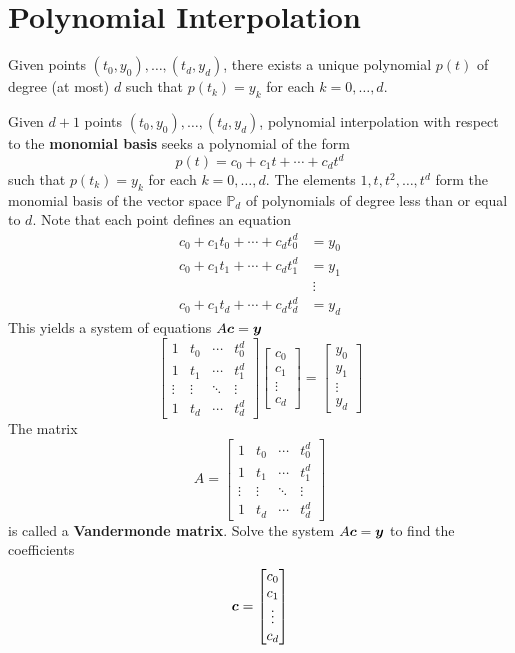 \section{Polynomial Interpolation}

\begin{bigidea}
Given points $(t_0,y_0), \dots , (t_d,y_d)$, there exists a unique polynomial $p(t)$ of degree (at most) $d$ such that $p(t_k) = y_k$ for each $k=0,\dots,d$.
\end{bigidea}

\begin{definition}
Given $d+1$ points $(t_0,y_0), \dots , (t_d,y_d)$, polynomial interpolation with respect to the {\bf monomial basis} \cite[p.312]{MH} seeks a polynomial of the form
$$
p(t) = c_0 + c_1 t + \cdots + c_d t^d
$$
such that $p(t_k) = y_k$ for each $k=0,\dots,d$. The elements $1,t,t^2,\dots,t^d$ form the monomial basis of the vector space $\mathbb{P}_d$ of polynomials of degree less than or equal to $d$. Note that each point defines an equation
\begin{align*}
c_0 + c_1t_0 + \cdots + c_d t_0^d &= y_0 \\
c_0 + c_1t_1 + \cdots + c_d t_1^d &= y_1 \\
& \ \vdots \\
c_0 + c_1t_d + \cdots + c_d t_d^d &= y_d
\end{align*}
This yields a system of equations $A \boldsymbol{c} = \boldsymbol{y}$
$$
\begin{bmatrix}
1 & t_0 & \cdots & t_0^d \\
1 & t_1 & \cdots & t_1^d \\
\vdots & \vdots & \ddots & \vdots \\
 1 & t_d & \cdots & t_d^d
\end{bmatrix}
\begin{bmatrix} c_0 \\ c_1 \\ \vdots \\ c_d \end{bmatrix}
=
\begin{bmatrix} y_0 \\ y_1 \\ \vdots \\ y_d \end{bmatrix}
$$
The matrix
$$
A = \begin{bmatrix}
1 & t_0 & \cdots & t_0^d \\
1 & t_1 & \cdots & t_1^d \\
\vdots & \vdots & \ddots & \vdots \\
 1 & t_d & \cdots & t_d^d
\end{bmatrix}
$$
is called a {\bf Vandermonde matrix}. Solve the system $A \boldsymbol{c} = \boldsymbol{y}$ to find the coefficients
$$
\boldsymbol{c} = \begin{bmatrix} c_0 \\ c_1 \\ \vdots \\ c_d \end{bmatrix}
$$
\end{definition}

